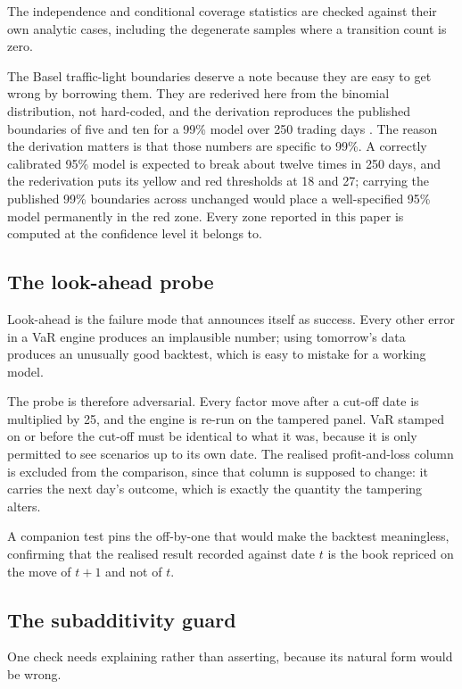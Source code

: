 The \citet{christoffersen1998} independence and conditional coverage statistics
are checked against their own analytic cases, including the degenerate samples
where a transition count is zero.

The Basel traffic-light boundaries deserve a note because they are easy to get
wrong by borrowing them. They are rederived here from the binomial
distribution, not hard-coded, and the derivation reproduces the published
boundaries of five and ten for a 99\% model over 250 trading days
\citep{bcbs1996backtesting}. The reason the derivation matters is that those
numbers are specific to 99\%. A correctly calibrated 95\% model is expected to
break about twelve times in 250 days, and the rederivation puts its yellow and
red thresholds at 18 and 27; carrying the published 99\% boundaries across
unchanged would place a well-specified 95\% model permanently in the red zone.
Every zone reported in this paper is computed at the confidence level it
belongs to.

\subsection{The look-ahead probe}

Look-ahead is the failure mode that announces itself as success. Every other
error in a VaR engine produces an implausible number; using tomorrow's data
produces an unusually good backtest, which is easy to mistake for a working
model.

The probe is therefore adversarial. Every factor move after a cut-off date is
multiplied by 25, and the engine is re-run on the tampered panel. VaR stamped
on or before the cut-off must be identical to what it was, because it is only
permitted to see scenarios up to its own date. The realised profit-and-loss
column is excluded from the comparison, since that column is supposed to
change: it carries the next day's outcome, which is exactly the quantity the
tampering alters.

A companion test pins the off-by-one that would make the backtest meaningless,
confirming that the realised result recorded against date $t$ is the book
repriced on the move of $t+1$ and not of $t$.

\subsection{The subadditivity guard}

One check needs explaining rather than asserting, because its natural form
would be wrong.

